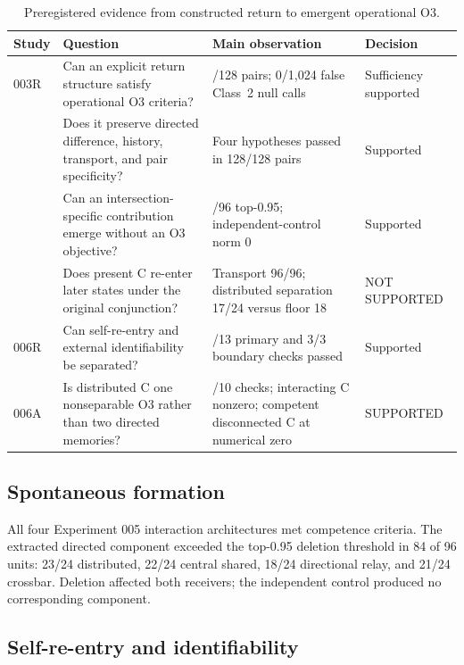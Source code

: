 \documentclass[11pt,a4paper]{article}
\newcommand{\statussupported}{\textsf{SUPPORTED}}
\newcommand{\statusnotsupported}{\textsf{NOT SUPPORTED}}
\begin{document}
\begin{table}[H]
\centering
\footnotesize
\caption{Preregistered evidence from constructed return to emergent operational O3.}
\begin{tabular}{@{}>{\raggedright\arraybackslash}p{1.15cm}>{\raggedright\arraybackslash}p{5.2cm}>{\raggedright\arraybackslash}p{5.0cm}>{\raggedright\arraybackslash}p{2.35cm}@{}}
\toprule
Study & Question & Main observation & Decision \\
\midrule
003R & Can an explicit return structure satisfy operational O3 criteria? & 126/128 pairs; 0/1,024 false Class~2 null calls & Sufficiency supported \\
004 & Does it preserve directed difference, history, transport, and pair specificity? & Four hypotheses passed in 128/128 pairs & Supported \\
005 & Can an intersection-specific contribution emerge without an O3 objective? & 84/96 top-0.95; independent-control norm 0 & Supported \\
006 & Does present C re-enter later states under the original conjunction? & Transport 96/96; distributed separation 17/24 versus floor 18 & \statusnotsupported \\
006R & Can self-re-entry and external identifiability be separated? & 13/13 primary and 3/3 boundary checks passed & Supported \\
006A & Is distributed C one nonseparable O3 rather than two directed memories? & 10/10 checks; interacting C nonzero; competent disconnected C at numerical zero & \statussupported \\
\bottomrule
\end{tabular}
\end{table}

\subsection{Spontaneous formation}

All four Experiment 005 interaction architectures met competence criteria. The extracted directed component exceeded the top-0.95 deletion threshold in 84 of 96 units: 23/24 distributed, 22/24 central shared, 18/24 directional relay, and 21/24 crossbar. Deletion affected both receivers; the independent control produced no corresponding component.

\subsection{Self-re-entry and identifiability}
\end{document}
